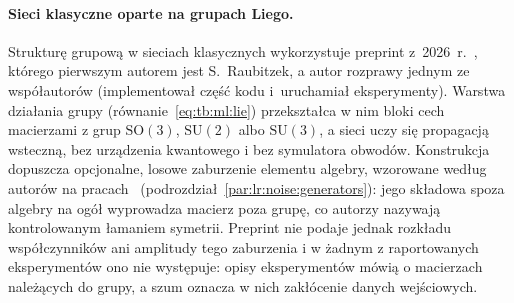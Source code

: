 \paragraph{Sieci klasyczne oparte na grupach Liego.}\label{par:lr:cls:lie}
Strukturę grupową w sieciach klasycznych wykorzystuje preprint z~2026~r.~\cite{raubitzek_lie_group_manuscript}, którego pierwszym autorem jest S.~Raubitzek, a autor rozprawy jednym ze współautorów (implementował część kodu i~uruchamiał eksperymenty).
Warstwa działania grupy (równanie~\eqref{eq:tb:ml:lie}) przekształca w nim bloki cech macierzami z grup $\mathrm{SO}(3)$, $\mathrm{SU}(2)$ albo $\mathrm{SU}(3)$, a sieci uczy się propagacją wsteczną, bez urządzenia kwantowego i bez symulatora obwodów.
Konstrukcja dopuszcza opcjonalne, losowe zaburzenie elementu algebry, wzorowane według autorów na pracach~\cite{raubitzek_obfuscation_2025,raubitzek_quantum_noise} (podrozdział~\ref{par:lr:noise:generators}): jego składowa spoza algebry na ogół wyprowadza macierz poza grupę, co autorzy nazywają kontrolowanym łamaniem symetrii.
Preprint nie podaje jednak rozkładu współczynników ani amplitudy tego zaburzenia i w żadnym z raportowanych eksperymentów ono nie występuje: opisy eksperymentów mówią o macierzach należących do grupy, a szum oznacza w nich zakłócenie danych wejściowych.

